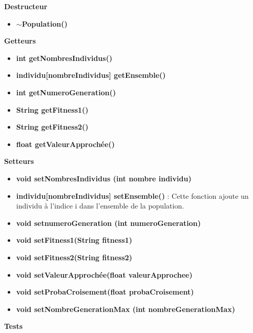 \documentclass[a4paper,11pt]{article}
\begin{document}
			\textbf{Destructeur}
					\begin{itemize}
							\item \textbf{$\sim$Population()}\\
					\end{itemize}
			\textbf{Getteurs}
					\begin{itemize}
							\item \textbf{int getNombresIndividus()}
							\item \textbf{individu[nombreIndividus] getEnsemble()}
							\item \textbf{int getNumeroGeneration()}
							\item \textbf{String getFitness1()}
							\item \textbf{String getFitness2()}
							\item \textbf{float getValeurApprochée()}\\
					\end{itemize}
			\textbf{Setteurs}
					\begin{itemize}
							\item \textbf{void setNombresIndividus (int nombre individu)}

							\item \textbf{individu[nombreIndividus] setEnsemble()} : Cette fonction ajoute un individu à l’indice i dans l’ensemble de la population.
							\item \textbf{void setnumeroGeneration (int numeroGeneration)}

							\item \textbf{void setFitness1(String fitness1)}
							\item \textbf{void setFitness2(String fitness2)}
							\item \textbf{void setValeurApprochée(float valeurApprochee)}
							\item \textbf{void setProbaCroisement(float probaCroisement)}
							\item \textbf{void setNombreGenerationMax (int nombreGenerationMax)}\\
					\end{itemize}
			\textbf{Tests}
\end{document}
